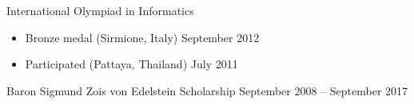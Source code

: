 \documentclass[line,margin]{res}
\newcommand{\wmeta}[1]{\sf#1\rm}
\begin{document}
\wmeta{International Olympiad in Informatics}
\begin{itemize}
  \item Bronze medal (Sirmione, Italy) \hfill September 2012
  \item Participated (Pattaya, Thailand) \hfill July 2011
\end{itemize}

\wmeta{Baron Sigmund Zois von Edelstein Scholarship} \hfill September 2008 -- September 2017


%
%

%
\end{document}
